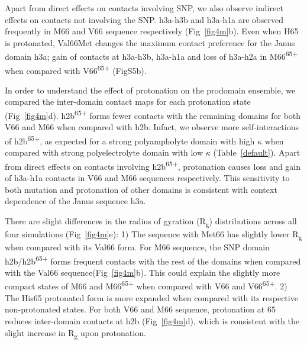 \documentclass[journal=jacsat,manuscript=article]{achemso}
\begin{document}
Apart from direct effects on contacts involving SNP, we also observe indirect effects on contacts not involving the SNP. h3a-h3b and h3a-h1a are observed frequently in M66 and V66 sequence respectively (Fig~\ref{fig4m}b). Even when H65 is protonated, Val66Met changes the maximum contact preference for the Janus domain h3a; gain of contacts at h3a-h3b, h3a-h1a and loss of h3a-h2a in M66\textsuperscript{65+} when compared with V66\textsuperscript{65+} (FigS5b). 

In order to understand the effect of protonation on the prodomain ensemble, we compared the inter-domain contact maps for each protonation state (Fig~\ref{fig4m}d). h2b\textsuperscript{65+} forms fewer contacts with the remaining domains for both V66 and M66 when compared with h2b. Infact, we observe more self-interactions of h2b\textsuperscript{65+}, as expected for a strong polyampholyte domain with high $\kappa$ when compared with strong polyelectrolyte domain with low $\kappa$ (Table~\ref{default}). 
Apart from direct effects on contacts involving h2b\textsuperscript{65+}, protonation causes loss and gain of h3a-h1a contacts in V66 and M66 sequences respectively. This sensitivity to both mutation and protonation of other domains is consistent with context dependence of the Janus sequence h3a.

There are slight differences in the radius of gyration (R\textsubscript{g}) distributions across all four simulations (Fig~\ref{fig4m}e): 1) The sequence with Met66 has slightly lower R\textsubscript{g} when compared with its Val66 form. For M66 sequence, the SNP domain h2b/h2b\textsuperscript{65+} forms frequent contacts with the rest of the domains when compared with the Val66 sequence(Fig~\ref{fig4m}b). This could explain the slightly more compact states of M66 and M66\textsuperscript{65+}  when compared with V66 and V66\textsuperscript{65+}. 2) The His65 protonated form is more expanded when compared with its respective non-protonated states. For both V66 and M66 sequence, protonation at 65 reduces inter-domain contacts at h2b (Fig~\ref{fig4m}d), which is consistent with the slight increase in R\textsubscript{g} upon protonation.


\end{document}
